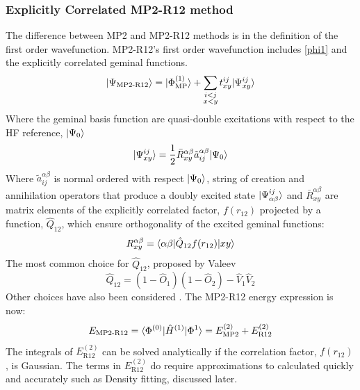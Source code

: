     \subsubsection{Explicitly Correlated MP2-R12 method}
      The difference between MP2 and MP2-R12 methods is in the definition of the first order wavefunction. %
      MP2-R12's first order wavefunction includes \cref{phi1} and the explicitly correlated geminal functions.
        \begin{equation}
          | \Psi_{\text{MP2-R12}} \rangle = | \Phi^{(1)}_{\text{MP}} \rangle + \sum_{\substack{i<j \\ x<y}} t^{ij}_{xy} | \Psi^{ij}_{xy} \rangle
        \end{equation}
      Where the geminal basis function are quasi-double excitations with respect to the HF reference, $| \Psi_0 \rangle$
        \begin{equation}
        | \Psi^{ij}_{xy} \rangle = \frac{1}{2} \bar{R}^{\alpha \beta}_{xy} \tilde{a}^{\alpha \beta}_{i j} | \Psi_0 \rangle
        \end{equation}
      Where $\tilde{a}^{\alpha\beta}_{ij}$ is normal ordered with respect $| \Psi_0 \rangle$, string of creation and annihilation operators that produce a doubly excited state $| \Psi^{ij}_{\alpha\beta} \rangle$ and $\bar{R}^{\alpha\beta}_{xy}$ are matrix elements of the explicitly correlated factor, $f(r_{12})$ projected by a function, $\hat{Q}_{12}$, which ensure orthogonality of the excited geminal functions:
        \begin{equation} \label{R}
          R^{\alpha \beta}_{xy} = \langle\alpha \beta | \hat{Q}_{12} f(r_{12})| xy \rangle
        \end{equation}
      The most common choice for $\hat{Q}_{12}$, proposed by Valeev\cite{Valeev2004} 
        \begin{equation}
          \hat{Q}_{12} = (1-\hat{O}_1)(1-\hat{O}_2)- \hat{V}_1 \hat{V}_2
        \end{equation}
      Other choices have also been considered \cite{Wind2002,Klopper2002}.
      The MP2-R12 energy expression is now: 
        \begin{equation}
          E_{\text{MP2-R12}} = \langle\Phi^{(0)} | \hat{H}^{(1)} | \Phi^{1} \rangle = E^{(2)}_{\text{MP2}} + E^{(2)}_{\text{R12}}
        \end{equation}
      The integrals of $E^{(2)}_{\text{R12}}$ can be solved analytically if the correlation factor, $f(r_{12})$, is Gaussian\cite{Polly2006}. The terms in $E^{(2)}_{\text{R12}}$ do require approximations to calculated quickly and accurately such as Density fitting, discussed later\cite{Kong2012}.

